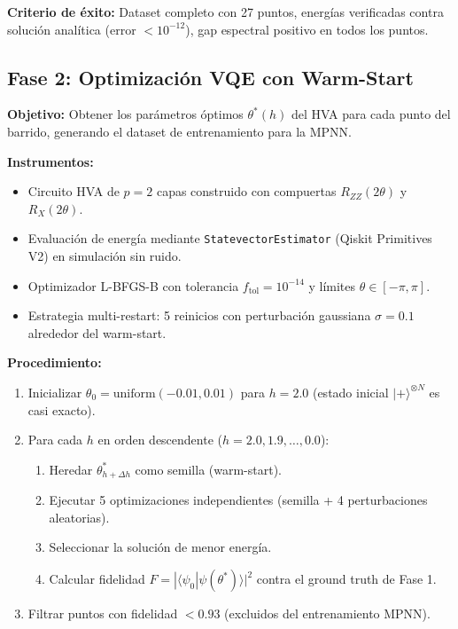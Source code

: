 \documentclass[11pt,a4paper,spanish]{book}
\begin{document}
\textbf{Criterio de éxito:} Dataset completo con 27 puntos, energías verificadas contra solución analítica (error $< 10^{-12}$), gap espectral positivo en todos los puntos.

\subsection{Fase 2: Optimización VQE con Warm-Start}

\textbf{Objetivo:} Obtener los parámetros óptimos $\theta^*(h)$ del HVA para cada punto del barrido, generando el dataset de entrenamiento para la MPNN.

\textbf{Instrumentos:}
\begin{itemize}
    \item Circuito HVA de $p = 2$ capas construido con compuertas $R_{ZZ}(2\theta)$ y $R_X(2\theta)$.
    \item Evaluación de energía mediante \texttt{StatevectorEstimator} (Qiskit Primitives V2) en simulación sin ruido.
    \item Optimizador L-BFGS-B con tolerancia $f_{\text{tol}} = 10^{-14}$ y límites $\theta \in [-\pi, \pi]$.
    \item Estrategia multi-restart: 5 reinicios con perturbación gaussiana $\sigma = 0.1$ alrededor del warm-start.
\end{itemize}

\textbf{Procedimiento:}
\begin{enumerate}
    \item Inicializar $\theta_0 = \text{uniform}(-0.01, 0.01)$ para $h = 2.0$ (estado inicial $|+\rangle^{\otimes N}$ es casi exacto).
    \item Para cada $h$ en orden descendente ($h = 2.0, 1.9, \ldots, 0.0$):
    \begin{enumerate}
        \item Heredar $\theta^*_{h+\Delta h}$ como semilla (warm-start).
        \item Ejecutar 5 optimizaciones independientes (semilla + 4 perturbaciones aleatorias).
        \item Seleccionar la solución de menor energía.
        \item Calcular fidelidad $F = |\langle \psi_0 | \psi(\theta^*) \rangle|^2$ contra el ground truth de Fase 1.
    \end{enumerate}
    \item Filtrar puntos con fidelidad $< 0.93$ (excluidos del entrenamiento MPNN).
\end{enumerate}
\end{document}
